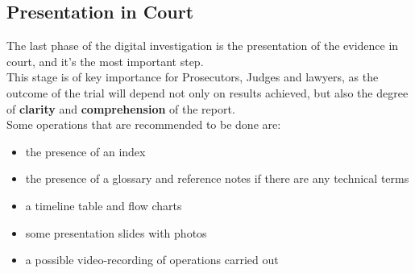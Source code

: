 \subsection{Presentation in Court}
The last phase of the digital investigation is the presentation of the
evidence in court, and it's the most important step.\\
This stage is of key importance for Prosecutors, Judges and lawyers,
as the outcome of the trial will depend not only on results achieved,
but also the degree of \textbf{clarity} and \textbf{comprehension} of
the report.\\
Some operations that are recommended to be done are:
\begin{itemize}
  \item the presence of an index
  \item the presence of a glossary and reference notes if there are
    any technical terms
  \item a timeline table and flow charts
  \item some presentation slides with photos
  \item a possible video-recording of operations carried out
\end{itemize}

